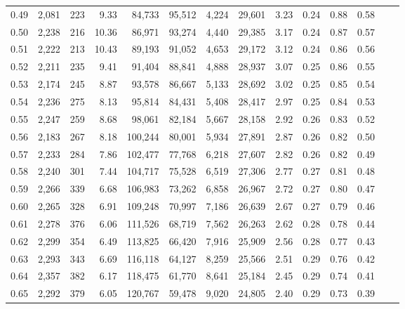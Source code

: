\begin{tabular}{rrrrrrrrrrrrrr}
0.49 &  2,081 &    223 &    9.33 &   84,733 &   95,512 &   4,224 &  29,601 &  3.23 &  0.24 &  0.88 &      0.58 \\
0.50 &  2,238 &    216 &   10.36 &   86,971 &   93,274 &   4,440 &  29,385 &  3.17 &  0.24 &  0.87 &      0.57 \\
0.51 &  2,222 &    213 &   10.43 &   89,193 &   91,052 &   4,653 &  29,172 &  3.12 &  0.24 &  0.86 &      0.56 \\
0.52 &  2,211 &    235 &    9.41 &   91,404 &   88,841 &   4,888 &  28,937 &  3.07 &  0.25 &  0.86 &      0.55 \\
0.53 &  2,174 &    245 &    8.87 &   93,578 &   86,667 &   5,133 &  28,692 &  3.02 &  0.25 &  0.85 &      0.54 \\
0.54 &  2,236 &    275 &    8.13 &   95,814 &   84,431 &   5,408 &  28,417 &  2.97 &  0.25 &  0.84 &      0.53 \\
0.55 &  2,247 &    259 &    8.68 &   98,061 &   82,184 &   5,667 &  28,158 &  2.92 &  0.26 &  0.83 &      0.52 \\
0.56 &  2,183 &    267 &    8.18 &  100,244 &   80,001 &   5,934 &  27,891 &  2.87 &  0.26 &  0.82 &      0.50 \\
0.57 &  2,233 &    284 &    7.86 &  102,477 &   77,768 &   6,218 &  27,607 &  2.82 &  0.26 &  0.82 &      0.49 \\
0.58 &  2,240 &    301 &    7.44 &  104,717 &   75,528 &   6,519 &  27,306 &  2.77 &  0.27 &  0.81 &      0.48 \\
0.59 &  2,266 &    339 &    6.68 &  106,983 &   73,262 &   6,858 &  26,967 &  2.72 &  0.27 &  0.80 &      0.47 \\
0.60 &  2,265 &    328 &    6.91 &  109,248 &   70,997 &   7,186 &  26,639 &  2.67 &  0.27 &  0.79 &      0.46 \\
0.61 &  2,278 &    376 &    6.06 &  111,526 &   68,719 &   7,562 &  26,263 &  2.62 &  0.28 &  0.78 &      0.44 \\
0.62 &  2,299 &    354 &    6.49 &  113,825 &   66,420 &   7,916 &  25,909 &  2.56 &  0.28 &  0.77 &      0.43 \\
0.63 &  2,293 &    343 &    6.69 &  116,118 &   64,127 &   8,259 &  25,566 &  2.51 &  0.29 &  0.76 &      0.42 \\
0.64 &  2,357 &    382 &    6.17 &  118,475 &   61,770 &   8,641 &  25,184 &  2.45 &  0.29 &  0.74 &      0.41 \\
0.65 &  2,292 &    379 &    6.05 &  120,767 &   59,478 &   9,020 &  24,805 &  2.40 &  0.29 &  0.73 &      0.39 \\

\end{tabular}
